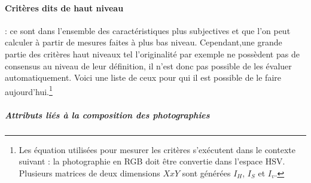\documentclass[11pt, french,screen]{report-rd-info}
\begin{document}
\paragraph{Critères dits de haut niveau} : ce sont dans l'ensemble des caractéristiques plus subjectives et que l'on peut calculer à partir de mesures faites à plus bas niveau. Cependant,une grande partie des critères haut niveaux tel l’originalité par exemple ne possèdent pas de consensus au niveau de leur définition, il n’est donc pas possible de les évaluer automatiquement. Voici une liste de ceux pour qui il est possible de le faire aujourd'hui.\footnote{Les équation utilisées pour mesurer les critères s'exécutent dans le contexte suivant : la photographie en RGB doit être convertie dans l'espace HSV. Plusieurs matrices de deux dimensions $X x Y$ sont générées $I_H$, $I_S$ et $I_v$.}
\subparagraph{Attributs liés à la composition des photographies}
\end{document}
